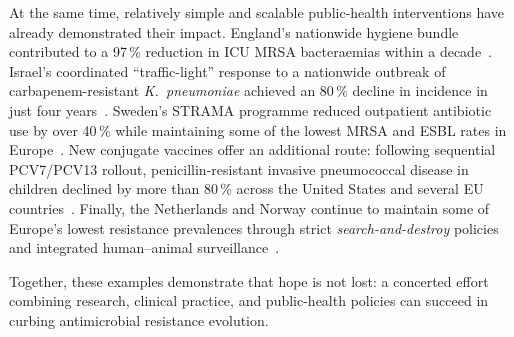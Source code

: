 \documentclass[../main.tex]{subfiles}
\begin{document}
At the same time, relatively simple and scalable public-health interventions have already demonstrated their impact.
England’s nationwide hygiene bundle contributed to a 97\,\% reduction in ICU MRSA bacteraemias within a decade~\cite{Edgeworth2020}.
Israel’s coordinated “traffic-light” response to a nationwide outbreak of carbapenem-resistant \textit{K.~pneumoniae} achieved an 80\,\% decline in incidence in just four years~\cite{Schwaber2011}.
Sweden’s STRAMA programme reduced outpatient antibiotic use by over 40\,\% while maintaining some of the lowest MRSA and ESBL rates in Europe~\cite{Molstad2017}.
New conjugate vaccines offer an additional route: following sequential PCV7/PCV13 rollout, penicillin-resistant invasive pneumococcal disease in children declined by more than 80\,\% across the United States and several EU countries~\cite{Olarte2022}.
Finally, the Netherlands and Norway continue to maintain some of Europe’s lowest resistance prevalences through strict \textit{search-and-destroy} policies and integrated human–animal surveillance~\cite{ECDC2023_NL_SE}.

Together, these examples demonstrate that hope is not lost: a concerted effort combining research, clinical practice, and public-health policies can succeed in curbing antimicrobial resistance evolution.
\end{document}

